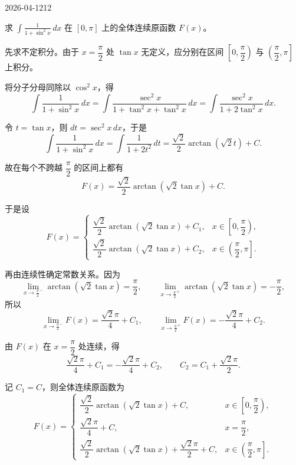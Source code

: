 \begin{mistake}{2026-04-12}{12}

\begin{problemcontent}
求 \( \displaystyle \int \frac{1}{1+\sin^2 x}\,dx \) 在 \( [0,\pi] \) 上的全体连续原函数 \(F(x)\)。

\end{problemcontent}

\begin{solutioncontent}
先求不定积分。由于 \(x=\dfrac{\pi}{2}\) 处 \(\tan x\) 无定义，应分别在区间 \(\left[0,\dfrac{\pi}{2}\right)\) 与 \(\left(\dfrac{\pi}{2},\pi\right]\) 上积分。

将分子分母同除以 \(\cos^2 x\)，得
\[
\int \frac{1}{1+\sin^2 x}\,dx
=\int \frac{\sec^2 x}{1+\tan^2 x+\tan^2 x}\,dx
=\int \frac{\sec^2 x}{1+2\tan^2 x}\,dx.
\]

令 \(t=\tan x\)，则 \(dt=\sec^2 x\,dx\)，于是
\[
\int \frac{1}{1+\sin^2 x}\,dx
=\int \frac{1}{1+2t^2}\,dt
=\frac{\sqrt{2}}{2}\arctan(\sqrt{2}t)+C.
\]

故在每个不跨越 \(\dfrac{\pi}{2}\) 的区间上都有
\[
F(x)=\frac{\sqrt{2}}{2}\arctan(\sqrt{2}\tan x)+C.
\]

于是设
\[
F(x)=
\begin{cases}
\dfrac{\sqrt{2}}{2}\arctan(\sqrt{2}\tan x)+C_1, & x\in\left[0,\dfrac{\pi}{2}\right),\\[6pt]
\dfrac{\sqrt{2}}{2}\arctan(\sqrt{2}\tan x)+C_2, & x\in\left(\dfrac{\pi}{2},\pi\right].
\end{cases}
\]

再由连续性确定常数关系。因为
\[
\lim_{x\to \frac{\pi}{2}^-}\arctan(\sqrt{2}\tan x)=\frac{\pi}{2},
\qquad
\lim_{x\to \frac{\pi}{2}^+}\arctan(\sqrt{2}\tan x)=-\frac{\pi}{2},
\]
所以
\[
\lim_{x\to \frac{\pi}{2}^-}F(x)=\frac{\sqrt{2}\pi}{4}+C_1,
\qquad
\lim_{x\to \frac{\pi}{2}^+}F(x)=-\frac{\sqrt{2}\pi}{4}+C_2.
\]

由 \(F(x)\) 在 \(x=\dfrac{\pi}{2}\) 处连续，得
\[
\frac{\sqrt{2}\pi}{4}+C_1=-\frac{\sqrt{2}\pi}{4}+C_2,
\qquad
C_2=C_1+\frac{\sqrt{2}\pi}{2}.
\]

记 \(C_1=C\)，则全体连续原函数为
\[
F(x)=
\begin{cases}
\dfrac{\sqrt{2}}{2}\arctan(\sqrt{2}\tan x)+C, & x\in\left[0,\dfrac{\pi}{2}\right),\\[6pt]
\dfrac{\sqrt{2}\pi}{4}+C, & x=\dfrac{\pi}{2},\\[6pt]
\dfrac{\sqrt{2}}{2}\arctan(\sqrt{2}\tan x)+\dfrac{\sqrt{2}\pi}{2}+C, & x\in\left(\dfrac{\pi}{2},\pi\right].
\end{cases}
\]


\end{solutioncontent}
\end{mistake}
